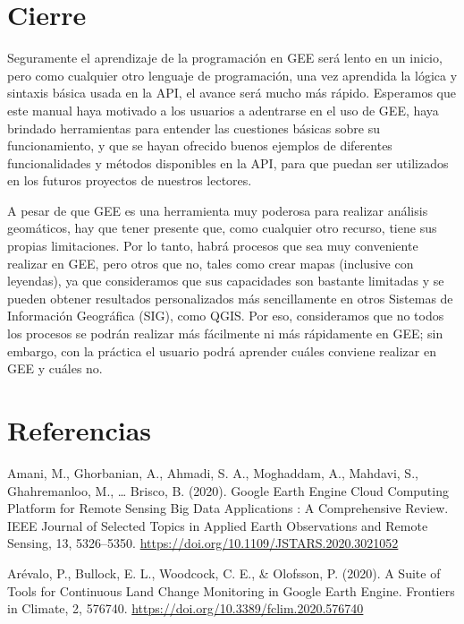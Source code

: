 \documentclass[
  12pt,
  letterpaper,
  twoside]{book}
\begin{document}
\newpage

\hypertarget{cierre}{%
\chapter{Cierre}\label{cierre}}

Seguramente el aprendizaje de la programación en GEE será lento en un inicio, pero como cualquier otro lenguaje de programación, una vez aprendida la lógica y sintaxis básica usada en la API, el avance será mucho más rápido. Esperamos que este manual haya motivado a los usuarios a adentrarse en el uso de GEE, haya brindado herramientas para entender las cuestiones básicas sobre su funcionamiento, y que se hayan ofrecido buenos ejemplos de diferentes funcionalidades y métodos disponibles en la API, para que puedan ser utilizados en los futuros proyectos de nuestros lectores.

A pesar de que GEE es una herramienta muy poderosa para realizar análisis geomáticos, hay que tener presente que, como cualquier otro recurso, tiene sus propias limitaciones. Por lo tanto, habrá procesos que sea muy conveniente realizar en GEE, pero otros que no, tales como crear mapas (inclusive con leyendas), ya que consideramos que sus capacidades son bastante limitadas y se pueden obtener resultados personalizados más sencillamente en otros Sistemas de Información Geográfica (SIG), como QGIS. Por eso, consideramos que no todos los procesos se podrán realizar más fácilmente ni más rápidamente en GEE; sin embargo, con la práctica el usuario podrá aprender cuáles conviene realizar en GEE y cuáles no.

\newpage

\hypertarget{referencias}{%
\chapter{Referencias}\label{referencias}}

Amani, M., Ghorbanian, A., Ahmadi, S. A., Moghaddam, A., Mahdavi, S., Ghahremanloo, M., \ldots{} Brisco, B. (2020). Google Earth Engine Cloud Computing Platform for Remote Sensing Big Data Applications : A Comprehensive Review. IEEE Journal of Selected Topics in Applied Earth Observations and Remote Sensing, 13, 5326--5350. \url{https://doi.org/10.1109/JSTARS.2020.3021052}

Arévalo, P., Bullock, E. L., Woodcock, C. E., \& Olofsson, P. (2020). A Suite of Tools for Continuous Land Change Monitoring in Google Earth Engine. Frontiers in Climate, 2, 576740. \url{https://doi.org/10.3389/fclim.2020.576740}
\end{document}
